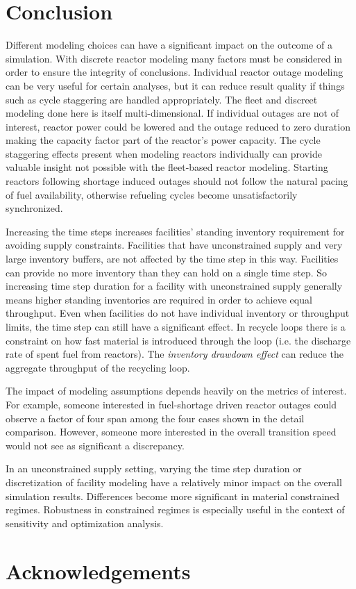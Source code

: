 \documentclass{style}
\begin{document}
\section{Conclusion}

Different modeling choices can have a significant impact on the outcome of a
simulation.  With discrete reactor modeling many factors must be considered in
order to ensure the integrity of conclusions.  Individual reactor outage
modeling can be very useful for certain analyses, but it can reduce result
quality if things such as cycle staggering are handled appropriately.  The
fleet and discreet modeling done here is itself multi-dimensional.  If
individual outages are not of interest, reactor power could be lowered and the
outage reduced to zero duration making the capacity factor part of the
reactor's power capacity.  The cycle staggering effects present when modeling
reactors individually can provide valuable insight not possible with the
fleet-based reactor modeling.  Starting reactors following shortage induced
outages should not follow the natural pacing of fuel availability, otherwise
refueling cycles become unsatisfactorily synchronized.

Increasing the time steps increases facilities' standing inventory requirement
for avoiding supply constraints.  Facilities that have unconstrained supply
and very large inventory buffers, are not affected by the time step in this
way.  Facilities can provide no more inventory than they can hold on a single
time step.  So increasing time step duration for a facility with unconstrained
supply generally means higher standing inventories are required in order to
achieve equal throughput. Even when facilities do not have individual
inventory or throughput limits, the time step can still have a significant
effect. In recycle loops there is a constraint on how fast material is
introduced through the loop (i.e. the discharge rate of spent fuel from
reactors).  The \emph{inventory drawdown effect} can reduce the aggregate
throughput of the recycling loop.

The impact of modeling assumptions depends heavily on the metrics of interest.
For example, someone interested in fuel-shortage driven reactor outages could
observe a factor of four span among the four cases shown in the detail
comparison.  However, someone more interested in the overall transition speed
would not see as significant a discrepancy.

In an unconstrained supply setting, varying the time step duration or
discretization of facility modeling have a relatively minor impact on the
overall simulation results.  Differences become more significant in material
constrained regimes.  Robustness in constrained regimes is especially useful
in the context of sensitivity and optimization analysis.

\section{Acknowledgements}



\end{document}
